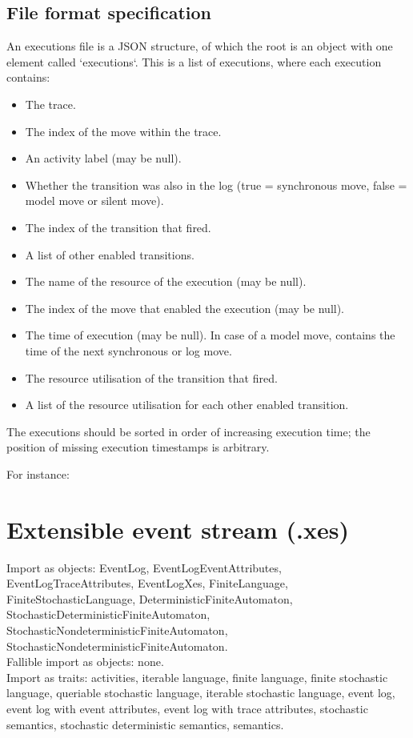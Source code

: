 {\subsection*{File format specification}An executions file is a JSON structure, of which the root is an object with one element called `executions`.
    This is a list of executions, where each execution contains:
    \begin{itemize}
        \item The trace.
        \item The index of the move within the trace.
        \item An activity label (may be null).
        \item Whether the transition was also in the log (true = synchronous move, false = model move or silent move).
        \item The index of the transition that fired.
        \item A list of other enabled transitions.
        \item The name of the resource of the execution (may be null).
        \item The index of the move that enabled the execution (may be null).
        \item The time of execution (may be null). In case of a model move, contains the time of the next synchronous or log move.
        \item The resource utilisation of the transition that fired.
        \item A list of the resource utilisation for each other enabled transition.
    \end{itemize} 
    The executions should be sorted in order of increasing execution time; the position of missing execution timestamps is arbitrary.
    
    For instance:
    
\clearpage
\section{Extensible event stream (.xes)}
\label{filehandler:extensible event stream}
Import as objects: EventLog, EventLogEventAttributes, EventLogTraceAttributes, EventLogXes, FiniteLanguage, FiniteStochasticLanguage, DeterministicFiniteAutomaton, StochasticDeterministicFiniteAutomaton, StochasticNondeterministicFiniteAutomaton, StochasticNondeterministicFiniteAutomaton.
\\Fallible import as objects: none.
\\Import as traits: activities, iterable language, finite language, finite stochastic language, queriable stochastic language, iterable stochastic language, event log, event log with event attributes, event log with trace attributes, stochastic semantics, stochastic deterministic semantics, semantics.
}
